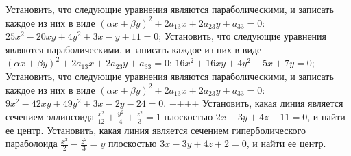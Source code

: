 Установить, что следующие уравнения являются параболическими, и записать каждое из них в виде $(\alpha x+\beta y)^2+2 a_{13} x+2 a_{23} y+a_{33}=0$: $25 x^2-20 x y+4 y^2+3 x-y+11=0$;
Установить, что следующие уравнения являются параболическими, и записать каждое из них в виде $(\alpha x+\beta y)^2+2 a_{13} x+2 a_{23} y+a_{33}=0$: $16 x^2+16 x y+4 y^2-5 x+7 y=0$;
Установить, что следующие уравнения являются параболическими, и записать каждое из них в виде $(\alpha x+\beta y)^2+2 a_{13} x+2 a_{23} y+a_{33}=0$: $9 x^2-42 x y+49 y^2+3 x-2 y-24=0$.
++++
Установить, какая линия является сечением эллипсоида $\frac{x^2}{12}+\frac{y^2}{4}+\frac{z^2}{3}=1$ плоскостью $2 x-3 y+4 z-11=0$, и найти ее центр.
Установить, какая линия является сечением гиперболического параболоида $\frac{x^2}{2}-\frac{z^2}{3}=y$ плоскостью $3 x-3 y+4 z+2=0$, и найти ее центр.